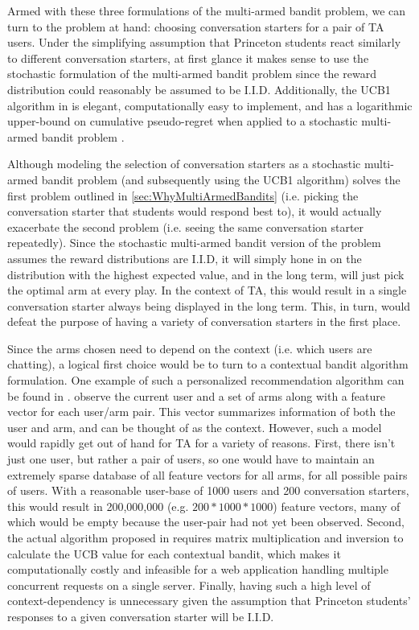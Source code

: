 Armed with these three formulations of the multi-armed bandit problem, we can turn to the problem at hand: choosing conversation starters for a pair of TA users. Under the simplifying assumption that Princeton students react similarly to different conversation starters, at first glance it makes sense to use the stochastic formulation of the multi-armed bandit problem since the reward distribution could reasonably be assumed to be I.I.D. Additionally, the UCB1 algorithm in is elegant, computationally easy to implement, and has a logarithmic upper-bound on cumulative pseudo-regret when applied to a stochastic multi-armed bandit problem \citep{auer02}.

Although modeling the selection of conversation starters as a stochastic multi-armed bandit problem (and subsequently using the UCB1 algorithm) solves the first problem outlined in \autoref{sec:WhyMultiArmedBandits} (i.e. picking the conversation starter that students would respond best to), it would actually exacerbate the second problem (i.e. seeing the same conversation starter repeatedly). Since the stochastic multi-armed bandit version of the problem assumes the reward distributions are I.I.D, it will simply hone in on the distribution with the highest expected value, and in the long term, will just pick the optimal arm at every play. In the context of TA, this would result in a single conversation starter always being displayed in the long term. This, in turn, would defeat the purpose of having a variety of conversation starters in the first place.

Since the arms chosen need to depend on the context (i.e. which users are chatting), a logical first choice would be to turn to a contextual bandit algorithm formulation. One example of such a personalized recommendation algorithm can be found in \cite{chu10}. \cite{chu10} observe the current user and a set of arms along with a feature vector for each user/arm pair. This vector summarizes information of both the user and arm, and can be thought of as the context. However, such a model would rapidly get out of hand for TA for a variety of reasons. First, there isn't just one user, but rather a pair of users, so one would have to maintain an extremely sparse database of all feature vectors for all arms, for all possible pairs of users. With a reasonable user-base of 1000 users and 200 conversation starters, this would result in 200,000,000 (e.g. $200 * 1000 * 1000$) feature vectors, many of which would be empty because the user-pair had not yet been observed. Second, the actual algorithm proposed in \cite{chu10} requires matrix multiplication and inversion to calculate the UCB value for each contextual bandit, which makes it computationally costly and infeasible for a web application handling multiple concurrent requests on a single server. Finally, having such a high level of context-dependency is unnecessary given the assumption that Princeton students' responses to a given conversation starter will be I.I.D.

